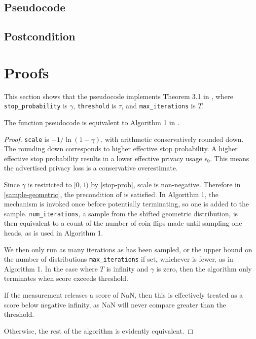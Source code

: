 \documentclass{article}
\begin{document}
\subsection*{Pseudocode}


\subsection*{Postcondition}

\section{Proofs}
This section shows that the pseudocode implements Theorem 3.1 in \cite{liu2018privateselectionprivatecandidates}, where 
\texttt{stop\_probability} is $\gamma$,
\texttt{threshold} is $\tau$, and
\texttt{max\_iterations} is $T$.

\begin{theorem}
    \label{algorithm-equivalence}
    The function pseudocode is equivalent to Algorithm 1 in \cite{liu2018privateselectionprivatecandidates}.
\end{theorem}

\begin{proof}
    \texttt{scale} is $-1 / \ln(1 - \gamma)$, with arithmetic conservatively rounded down.
    The rounding down corresponds to higher effective stop probability.
    A higher effective stop probability results in a lower effective privacy usage $\epsilon_0$.
    This means the advertised privacy loss is a conservative overestimate.

    Since $\gamma$ is restricted to $[0, 1)$ by \ref{stop-prob}, scale is non-negative.
    Therefore in \ref{sample-geometric}, 
    the precondition of  is satisfied.
    In Algorithm 1, the mechanism is invoked once before potentially terminating, so one is added to the sample.
    \texttt{num\_iterations}, a sample from the shifted geometric distribution, 
    is then equivalent to a count of the number of coin flips made until sampling one heads,
    as is used in Algorithm 1.

    We then only run as many iterations as has been sampled, or the upper bound on the number of distributions \texttt{max\_iterations} if set, 
    whichever is fewer, as in Algorithm 1.
    In the case where $T$ is infinity and $\gamma$ is zero, then the algorithm only terminates when score exceeds threshold.

    If the measurement releases a score of NaN, then this is effectively treated as a score below negative infinity, 
    as NaN will never compare greater than the threshold.

    Otherwise, the rest of the algorithm is evidently equivalent.
\end{proof}
\end{document}
